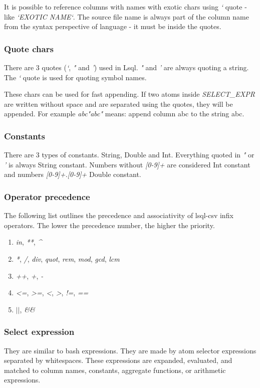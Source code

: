 It is possible to reference columns with names with exotic chars using \textit{`} quote - like \textit{`EXOTIC NAME`}. The source file name is always part of the column name from the syntax perspective of language - it must be inside the quotes.

\subsubsection{Quote chars}
There are 3 quotes (\textit{`}, \textit{"} and \textit{'}) used in Lsql. \textit{"} and \textit{'} are always quoting a string. The \textit{`} quote is used for quoting symbol names.

These chars can be used for fast appending. If two atoms inside \textit{SELECT\_\-EXPR} are written without space and are separated using the quotes, they will be appended. For example \textit{abc"abc"} means: append column abc to the string abc.

\subsubsection{Constants}
There are 3 types of constants. String, Double and Int. Everything quoted in \textit{"} or \textit{'} is always String constant. Numbers without \textit{[0-9]+} are considered Int constant and numbers \textit{[0-9]+.[0-9]+} Double constant.

\subsubsection{Operator precedence}
The following list outlines the precedence and associativity of lsql-csv infix operators. The lower the precedence number, the higher the priority.

\begin{enumerate}
    \item \textit{in}, \textit{**}, \textit{\^}
    \item \textit{*}, \textit{/}, \textit{div}, \textit{quot}, \textit{rem}, \textit{mod}, \textit{gcd}, \textit{lcm}
    \item \textit{++}, \textit{+}, \textit{-}
    \item \textit{\textless=}, \textit{\textgreater=}, \textit{\textless}, \textit{\textgreater}, \textit{!=}, \textit{==}
    \item \textit{$\vert\vert$}, \textit{\&\&}
\end{enumerate}

\subsubsection{Select expression}
They are similar to bash expressions\cite{bash-reference-manual}. They are made by atom selector expressions separated by whitespaces. These expressions are expanded, evaluated, and matched to column names, constants, aggregate functions, or arithmetic expressions.

